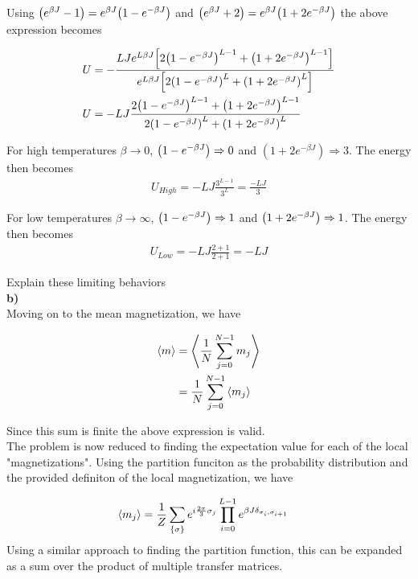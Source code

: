 \documentclass[12pt]{article}
\begin{document}
Using $\qty(e^{\beta J} - 1) = e^{\beta J}\qty(1 - e^{-\beta J})$ and
$\qty(e^{\beta J}+2) = e^{\beta J}\qty(1 + 2e^{-\beta J})$ the above
expression becomes

\begin{align*}
    U &= -\frac{LJe^{L\beta J}\qty[2\qty(1-e^{-\beta J})^{L-1} + \qty(1 +
    2e^{-\beta J})^{L-1}]}{e^{L\beta J}\qty[2\qty(1-e^{-\beta J})^L + \qty(1 +
    2e^{-\beta J})^L]} \\
    U &= -LJ\frac{2\qty(1-e^{-\beta J})^{L-1} + \qty(1 +
    2e^{-\beta J})^{L-1}}{2\qty(1-e^{-\beta J})^L + \qty(1 +
    2e^{-\beta J})^L}
\end{align*}

For high temperatures $\beta \rightarrow 0$, $\qty(1-e^{-\beta J}) \Rightarrow
0$ and $(1 + 2e^{-\beta J}) \Rightarrow 3$. The energy then becomes
\begin{align*}
    U_{High} = -LJ\frac{3^{L-1}}{3^L} = \frac{-LJ}{3}
\end{align*}

For low temperatures $\beta \rightarrow \infty$, $\qty(1-e^{-\beta J})
\Rightarrow 1$ and $\qty(1 + 2e^{-\beta J}) \Rightarrow 1$. The energy then
becomes
\begin{align*}
    U_{Low} = -LJ\frac{2 + 1}{2 + 1} = -LJ
\end{align*}

Explain these limiting behaviors
\\
\textbf{b)} \\

Moving on to the mean magnetization, we have

\begin{align*}
    \expval{m} &= \expval{\frac{1}{N}\sum_{j=0}^{N-1}m_j} \\
    &= \frac{1}{N}\sum_{j=0}^{N-1}\expval{m_j}
\end{align*}

Since this sum is finite the above expression is valid. \\
The problem is now reduced to finding the expectation value for each of the
local "magnetizations". Using the partition funciton as the probability
distribution and the provided definiton of the local magnetization, we have

\begin{align*}
    \expval{m_j} &=
    \frac{1}{Z}\sum_{\{\sigma\}}e^{i\frac{2\pi}{3}\sigma_j}\prod_{i=0}^{L-1}
    e^{\beta J \delta_{\sigma_i, \sigma_{i+1}}}
\end{align*}
Using a similar approach to finding the partition function, this can be
expanded as a sum over the product of multiple transfer matrices.
\end{document}
